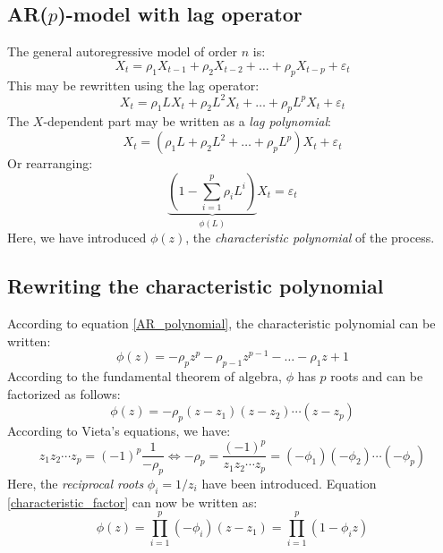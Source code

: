 \documentclass[12pt, a4paper]{article}
\numberwithin{equation}{section}
\begin{document}
\subsection{AR($p$)-model with lag operator}
The general autoregressive model of order $n$ is:
\begin{equation}
X_t=\rho_1 X_{t-1}+\rho_2 X_{t-2}+\ldots+\rho_p X_{t-p}+\varepsilon_t
\end{equation}
This may be rewritten using the lag operator:
\begin{equation}
X_t=\rho_1 L X_t+\rho_2 L^2 X_t+\ldots+\rho_p L^p X_t+\varepsilon_t
\end{equation}
The $X$-dependent part may be written as a \textit{lag polynomial}:
\begin{equation}
X_t=(\rho_1 L+\rho_2 L^2+\ldots+\rho_p L^p)X_t+\varepsilon_t
\end{equation}
Or rearranging:
\begin{equation}
\label{AR_polynomial}
\underbrace{\left(1-\sum_{i=1}^p\rho_i L^i\right)}_{\phi(L)}X_t=\varepsilon_t
\end{equation}
Here, we have introduced $\phi(z)$, the \textit{characteristic polynomial} of the process.

\subsection{Rewriting the characteristic polynomial}
According to equation \ref{AR_polynomial}, the characteristic polynomial can be written:
\begin{equation}
\phi(z)=-\rho_p z^p-\rho_{p-1}z^{p-1}-\ldots -\rho_1 z+1
\end{equation}
According to the fundamental theorem of algebra, $\phi$ has $p$ roots and can be factorized as follows:
\begin{equation}
\label{characteristic_factor}
\phi(z)=-\rho_p(z-z_1)(z-z_2)\cdots(z-z_p)
\end{equation}
According to Vieta's equations, we have:
\begin{equation}
z_1 z_2\cdots z_p=(-1)^p\frac{1}{-\rho_p}\Leftrightarrow -\rho_p=\frac{(-1)^p}{z_1 z_2\cdots z_p}=(-\phi_1)(-\phi_2)\cdots(-\phi_p)
\end{equation}
Here, the \textit{reciprocal roots} $\phi_i=1/z_i$ have been introduced. Equation \ref{characteristic_factor} can now be written as:
\begin{equation}
\label{rewritten_characteristic}
\phi(z)=\prod_{i=1}^p(-\phi_i)(z-z_1)=\prod_{i=1}^p(1-\phi_i z)
\end{equation}
\end{document}
